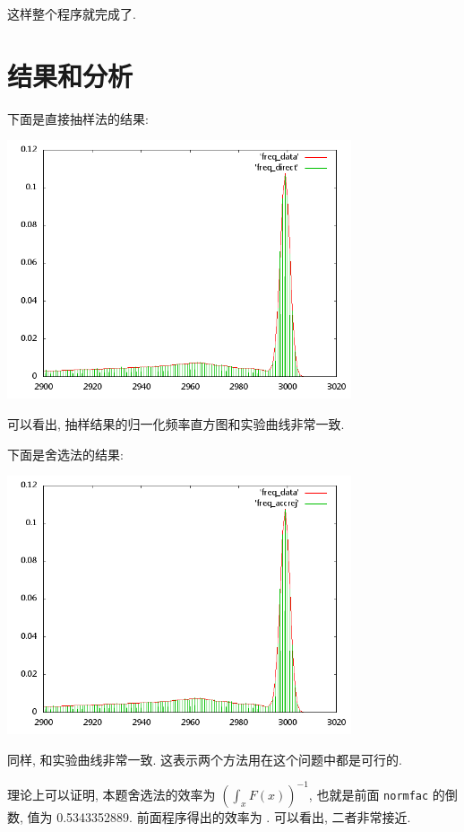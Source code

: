 \documentclass{ctexart}
\begin{document}
这样整个程序就完成了.

\section{结果和分析}
下面是直接抽样法的结果:
\begin{center}
\includegraphics[width=4in]{direct.png}
\end{center}
可以看出, 抽样结果的归一化频率直方图和实验曲线非常一致.

下面是舍选法的结果:
\begin{center}
\includegraphics[width=4in]{accrej.png}
\end{center}
同样, 和实验曲线非常一致. 这表示两个方法用在这个问题中都是可行的.

理论上可以证明, 本题舍选法的效率为 $\left(\int_x F(x)\right)^{-1}$, 也就是前面
\verb|normfac| 的倒数, 值为 0.5343352889. 前面程序得出的效率为
\relax\unskip. 可以看出, 二者非常接近.
\end{document}
